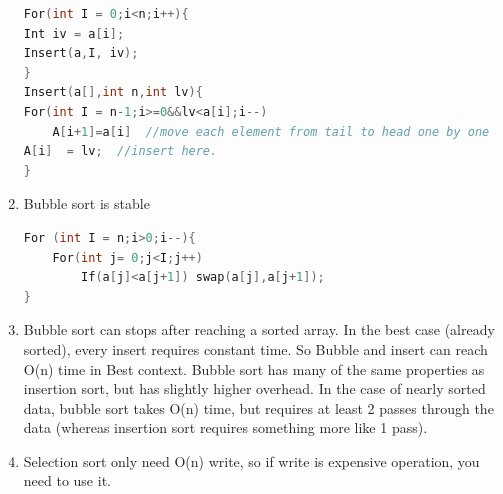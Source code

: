\documentclass[a4paper,11pt,twoside]{book}
\begin{document}
\begin{enumerate}
\begin{lstlisting}[frame=single, language=c++]
For(int I = 0;i<n;i++){
Int iv = a[i];
Insert(a,I, iv);
}
Insert(a[],int n,int lv){
For(int I = n-1;i>=0&&lv<a[i];i--)
    A[i+1]=a[i]  //move each element from tail to head one by one
A[i]  = lv;  //insert here. 
}
\end{lstlisting}

\item Bubble sort is stable 
\begin{lstlisting}[frame=single, language=c++]
For (int I = n;i>0;i--){
	For(int j= 0;j<I;j++)
		If(a[j]<a[j+1]) swap(a[j],a[j+1]);
}
\end{lstlisting}

\item Bubble sort can stops after reaching a sorted array. In the best case (already sorted), every insert requires constant time. So Bubble and insert can reach O(n) time in Best context. Bubble sort has many of the same properties as insertion sort, but has slightly higher overhead. In the case of nearly sorted data, bubble sort takes O(n) time, but requires at least 2 passes through the data (whereas insertion sort requires something more like 1 pass).

\item Selection sort only need O(n) write, so if write is expensive operation, you need to use it. 
\end{enumerate}  
\end{document}
